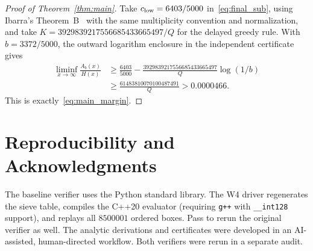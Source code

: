 \documentclass[11pt,reqno]{amsart}
\theoremstyle{remark}
\numberwithin{equation}{section}
\begin{document}
\begin{proof}[Proof of Theorem~\ref{thm:main}]
Take $c_{\rm low}=6403/5000$ in~\eqref{eq:final_sub}, using Ibarra's Theorem~B~\cite{Ibarra2026} with the same multiplicity convention and normalization, and take $K=3929839217556685433665497/Q$ for the delayed greedy rule. With $b=3372/5000$, the outward logarithm enclosure in the independent certificate gives
\[
\begin{aligned}
\liminf_{x\to\infty}\frac{A_b(x)}{H(x)}
&\ge \frac{6403}{5000}
-\frac{3929839217556685433665497}{Q}\log(1/b)\\
&\ge \frac{61483810070100487491}{Q}>0.0000466.
\end{aligned}
\]
This is exactly~\eqref{eq:main_margin}.
\end{proof}

\section*{Reproducibility and Acknowledgments}
The baseline verifier  uses the Python standard library. The W4 driver  regenerates the sieve table, compiles the C++20 evaluator (requiring \texttt{g++} with \texttt{\_\_int128} support), and replays all $8500001$ ordered boxes. Pass  to rerun the original verifier as well. The analytic derivations and certificates were developed in an AI-assisted, human-directed workflow. Both verifiers were rerun in a separate audit.
\end{document}
